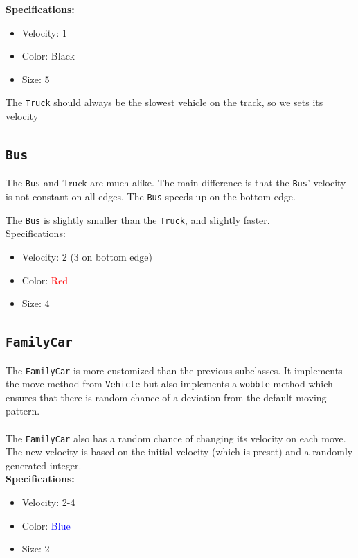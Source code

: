 \textbf{Specifications:}
\begin{itemize}
    \item Velocity: 1
    \item Color: Black
    \item Size: 5
\end{itemize}

The \texttt{Truck} should always be the slowest vehicle on the track, so we sets its velocity 
\subsection{\texttt{Bus}}
The \texttt{Bus} and Truck are much alike. The main difference is that the \texttt{Bus}' velocity is not constant on all edges. The \texttt{Bus} speeds up on the bottom edge. 

The \texttt{Bus} is slightly smaller than the \texttt{Truck}, and slightly faster.\\

Specifications:
\begin{itemize}
    \item Velocity: 2 (3 on bottom edge)
    \item Color: \textcolor{red}{Red}
    \item Size: 4
\end{itemize}

\subsection{\texttt{FamilyCar}}
The \texttt{FamilyCar} is more customized than the previous subclasses. It implements the move method from \texttt{Vehicle} but also implements a \texttt{wobble} method which ensures that there is random chance of a deviation from the default moving pattern.\\
\\
The \texttt{FamilyCar} also has a random chance of changing its velocity on each move.
The new velocity is based on the initial velocity (which is preset) and a randomly generated integer.\\

\textbf{Specifications:}
\begin{itemize}
    \item Velocity: 2-4
    \item Color: \textcolor{blue}{Blue}
    \item Size: 2
\end{itemize}

